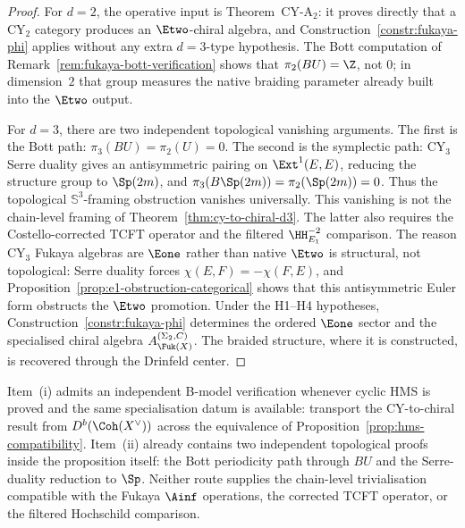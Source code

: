 \begin{proof}
For $d = 2$, the operative input is Theorem~CY-A$_2$: it proves
directly that a CY$_2$ category produces an $\Etwo$-chiral algebra,
and Construction~\ref{constr:fukaya-phi} applies without any extra
$d = 3$-type hypothesis. The Bott computation of
Remark~\ref{rem:fukaya-bott-verification} shows that
$\pi_2(BU) = \Z$, not $0$; in dimension~$2$ that group measures the
native braiding parameter already built into the $\Etwo$ output.

For $d = 3$, there are two independent topological vanishing
arguments. The first is the Bott path:
$\pi_3(BU) = \pi_2(U) = 0$. The second is the symplectic path:
CY$_3$ Serre duality gives an antisymmetric pairing on
$\Ext^1(E, E)$, reducing the structure group to $\Sp(2m)$, and
$\pi_3(B\Sp(2m)) = \pi_2(\Sp(2m)) = 0$. Thus the topological
$\mathbb{S}^3$-framing obstruction vanishes universally. This
vanishing is not the chain-level framing of
Theorem~\ref{thm:cy-to-chiral-d3}. The latter also requires the
Costello-corrected TCFT operator and the filtered
$\HH^{-2}_{E_1}$ comparison. The reason CY$_3$ Fukaya algebras are
$\Eone$ rather than native $\Etwo$ is structural, not topological:
Serre duality forces
$\chi(E, F) = -\chi(F, E)$, and
Proposition~\ref{prop:e1-obstruction-categorical} shows that this
antisymmetric Euler form obstructs the $\Etwo$ promotion. Under the
H1--H4 hypotheses, Construction~\ref{constr:fukaya-phi} determines
the ordered $\Eone$ sector and the specialised chiral algebra
$A_{\Fuk(X)}^{(\Sigma_2,C)}$. The braided structure, where it is
constructed, is recovered through the Drinfeld center.
\end{proof}

\begin{remark}
\label{rem:fukaya-phi-status-secondary}
Item~(i) admits an independent B-model verification whenever cyclic
HMS is proved and the same specialisation datum is available:
transport the CY-to-chiral result from
$D^b(\Coh(X^\vee))$ across the equivalence of
Proposition~\ref{prop:hms-compatibility}. Item~(ii) already contains two
independent topological proofs inside the proposition itself: the
Bott periodicity path through $BU$ and the Serre-duality reduction to
$\Sp$. Neither route supplies the chain-level trivialisation
compatible with the Fukaya $\Ainf$ operations, the corrected TCFT
operator, or the filtered Hochschild comparison.
\end{remark}


